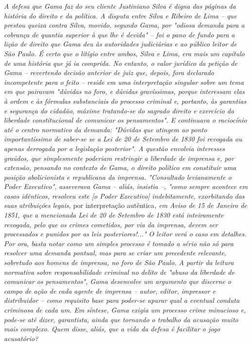 \emph{A defesa que Gama faz do seu cliente Justiniano Silva é digna das
páginas da história do direito e da política. A disputa entre Silva e
Ribeiro de Lima -- que prestou queixa contra Silva, movido, segundo
Gama, por "odiosa demanda para a cobrança de quantia superior à que lhe
é devida" -- foi o pano de fundo para a lição de direito que Gama deu às
autoridades judiciárias e ao público leitor de São Paulo. É certo que o
litígio entre ambos, Silva e Lima, era mais um capítulo de uma história
que já ia comprida. No entanto, o valor jurídico da petição de Gama --
revertendo decisão anterior de juiz que, depois, fora declarado
incompetente para o feito -- reside em uma interpretação singular sobre
um tema em que pairavam "dúvidas no foro, e dúvidas gravíssimas, porque
interessam elas à ordem e às fórmulas substanciais do processo criminal
e, portanto, às garantias e segurança do cidadão, máxime tratando-se do
sagrado direito e exercício da liberdade constitucional de comunicar os
pensamentos". E continuava o raciocínio até o centro normativo da
demanda: "Dúvidas que atingem ao ponto importantíssimo de saber-se se a
Lei de 20 de Setembro de 1830 foi revogada ou apenas derrogada por a
legislação posterior". A questão envolvia interesses graúdos, que
simplesmente poderiam restringir a liberdade de imprensa e, por
extensão, pensando no contexto de Gama, o direito político em constituir
uma posição abolicionista e republicana da imprensa. "Consultado
levianamente o Poder Executivo", asseverava Gama -- aliás, insistia --,
"como sempre acontece em casos idênticos, resolveu este {[}o Poder
Executivo{]} indebitamente, exorbitando das suas atribuições legais,}
por interpretação autêntica\emph{, em Aviso de 15 de Janeiro de 1851,
que a mencionada Lei de 20 de Setembro de 1830 está inteiramente
revogada, pelo que os crimes cometidos, por via da imprensa, devem ser
processados e punidos por as leis posteriores!..." O leitor verá o caso
em detalhes. Por ora, basta notar como um simples processo é tomado a
sério não só para resolver uma demanda pontual, mas para se criar um
precedente relevante, sobretudo aos homens de imprensa, no foro de São
Paulo. A partir da leitura normativa sobre responsabilidade criminal no
delito de "abuso da liberdade de comunicar os pensamentos", Gama
desenvolve um argumento que discerne o campo de ação de cada agente de
imprensa -- autor, editor, impressor e distribuidor -- como requisito
base para poder-se apurar qual a eventual conduta criminosa de cada um.
Em síntese, Gama exigia um processo crime minucioso e, pode-se até
dizer, garantista, ainda que tornando o trabalho da acusação muito mais
complexo. Quem disse, aliás, que a vida da defesa é facilitar o jogo
acusatório? }

